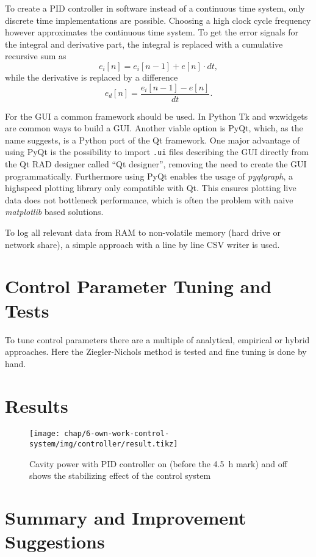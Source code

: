 To create a PID controller in software instead of a continuous time system, only discrete time implementations are possible. Choosing a high clock cycle frequency however approximates the continuous time system. To get the error signals for the integral and derivative part, the integral is replaced with a cumulative recursive sum as
\begin{equation}
e_i[n]=e_i[n-1]+e[n] \cdot dt,
\end{equation}
while the derivative is replaced by a difference
\begin{equation}
e_d[n]=\frac{e_i[n-1]-e[n]}{dt}.
\end{equation}

For the GUI a common framework should be used. In Python Tk and wxwidgets are common ways to build a GUI. Another viable option is PyQt, which, as the name suggests, is a Python port of the Qt framework. One major advantage of using PyQt is the possibility to import \texttt{.ui} files describing the GUI directly from the Qt RAD designer called ``Qt designer'', removing the need to create the GUI programmatically. Furthermore using PyQt enables the usage of \textit{pyqtgraph}, a highspeed plotting library only compatible with Qt. This ensures plotting live data does not bottleneck performance, which is often the problem with naive \textit{matplotlib} based solutions.

To log all relevant data from RAM to non-volatile memory (hard drive or network share), a simple approach with a line by line CSV writer is used.


\FloatBarrier
\section{Control Parameter Tuning and Tests}
To tune control parameters there are a multiple of analytical, empirical or hybrid approaches. Here the Ziegler-Nichols method is tested and fine tuning is done by hand.

\FloatBarrier
\section{Results}

\begin{figure}[tb]
	\centering
	\texttt{[image: chap/6-own-work-control-system/img/controller/result.tikz]}
	\caption{Cavity power with PID controller on (before the \SI{4.5}{\hour} mark) and off shows the stabilizing effect of the control system}
	\label{fig:own-work-pid-result}
\end{figure}

\FloatBarrier
\section{Summary and Improvement Suggestions}